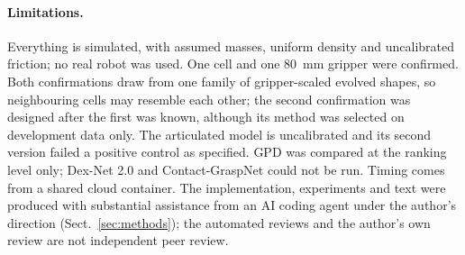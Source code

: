\paragraph{Limitations.} Everything is simulated, with assumed masses, uniform density and uncalibrated friction; no real robot was used. One cell and one 80~mm gripper were confirmed. Both confirmations draw from one family of gripper-scaled evolved shapes, so neighbouring cells may resemble each other; the second confirmation was designed after the first was known, although its method was selected on development data only. The articulated model is uncalibrated and its second version failed a positive control as specified. GPD was compared at the ranking level only; Dex-Net 2.0 and Contact-GraspNet could not be run. Timing comes from a shared cloud container. The implementation, experiments and text were produced with substantial assistance from an AI coding agent under the author's direction (Sect.~\ref{sec:methods}); the automated reviews and the author's own review are not independent peer review.
